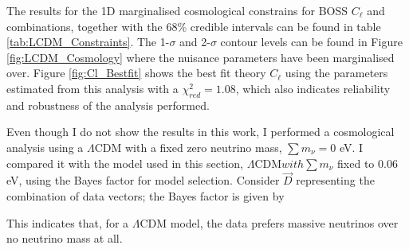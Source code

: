 \qquad The results for the 1D marginalised cosmological constrains for BOSS $C_{\ell}$ and combinations, together with the 68\% credible intervals can be found in table \ref{tab:LCDM_Constraints}. The 1-$\sigma$ and 2-$\sigma$ contour levels can be found in Figure \ref{fig:LCDM_Cosmology} where the nuisance parameters have been marginalised over. Figure \ref{fig:Cl_Bestfit} shows the best fit theory $C_{\ell}$ using the parameters estimated from this analysis with a $\chi^2_{red} = 1.08$, which also indicates reliability and robustness of the analysis performed. 

Even though I do not show the results in this work, I performed a cosmological analysis using a $\Lambda$CDM with a fixed zero neutrino mass, $\sum m_{\nu} = 0$ eV. I compared it with the model used in this section, $\Lambda$CDM$ with \sum m_{\nu}$ fixed to $0.06$ eV, using the Bayes factor for model selection. Consider $\vec{D}$ representing the combination of data vectors; the Bayes factor is given by

\noindent This indicates that, for a $\Lambda$CDM model, the data prefers massive neutrinos over no neutrino mass at all.


